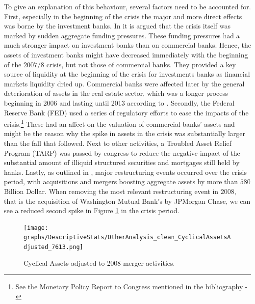 \documentclass[12pt, a4paper]{article} %
\begin{document}

To give an explanation of this behaviour, several factors need to be accounted for. First, especially in the beginning of the crisis the major and more direct effects was borne by the investment banks. In \citet{antoniades2019commercial} it is argued that the crisis itself was marked by sudden aggregate funding pressures. These funding pressures had a much stronger impact on investment banks than on commercial banks. Hence, the assets of investment banks might have decreased immediately with the beginning of the $2007/8$ crisis, but not those of commercial banks. They provided a key source of liquidity at the beginning of the crisis for investments banks as financial markets liquidity dried up. Commercial banks were affected later by the general deterioration of assets in the real estate sector, which was a longer process beginning in 2006 and lasting until 2013 according to \citet{antoniades2019commercial}.
Secondly, the Federal Reserve Bank (FED) used a series of regulatory efforts to ease the impacts of the crisis.\footnote{See the Monetary Policy Report to Congress mentioned in the bibliography - \citep{FEDReport}} These had an affect on the valuation of commercial banks' assets and might be the reason why the spike in assets in the crisis was substantially larger than the fall that followed. Next to other activities, a Troubled Asset Relief Program (TARP) was passed by congress to reduce the negative impact of the substantial amount of  illiquid  structured  securities  and  mortgages  still held  by  hanks. 
Lastly, as outlined in \citet{bech2009profits}, major restructuring events occurred over the crisis period, with acquisitions and mergers boosting aggregate assets by more than $580$ Billion Dollar. When removing the most relevant restructuring event in $2008$, that is the acquisition of  Washington Mutual  Bank's  by JPMorgan Chase, we can see a reduced second spike in Figure \ref{fig:cyclial_assets_adjusted} in the crisis period. 

\begin{figure}[H]
\begin{minipage}{\textwidth}
\texttt{[image: graphs/DescriptiveStats/OtherAnalysis\_clean\_CyclicalAssetsAdjusted\_7613.png]}
\caption[1]{Cyclical Assets adjusted to 2008 merger activities.}
\label{fig:cyclial_assets_adjusted}
\end{minipage}
\end{figure}
\end{document}
